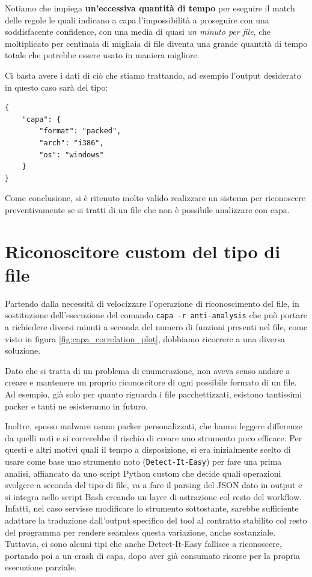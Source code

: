 \medskip

Notiamo che impiega \textbf{un'eccessiva quantità di tempo} per
eseguire il match delle regole le quali indicano a capa l'impossibilità a proseguire con una soddisfacente confidence, con una media di quasi \emph{un minuto per file}, che moltiplicato per centinaia di migliaia di file diventa una grande quantità di tempo totale che potrebbe essere usato in maniera migliore.

\medskip

Ci basta avere i dati di ciò che stiamo trattando, ad esempio l'output desiderato in questo caso sarà del tipo:
\begin{verbatim}
{
    "capa": {
        "format": "packed",
        "arch": "i386",
        "os": "windows"
    }
}
\end{verbatim}

Come conclusione, si è ritenuto molto valido realizzare un sistema per riconoscere preventivamente se si tratti di un file che non è possibile analizzare con capa.

\section{Riconoscitore custom del tipo di file}
\label{chap:static_custom_file_detector}
Partendo dalla necessità di velocizzare l'operazione di riconoscimento del file, in sostituzione dell'esecuzione del comando \texttt{capa -r anti-analysis} che può portare a richiedere diversi minuti a seconda del numero di funzioni presenti nel file, come visto in figura \ref{fig:capa_correlation_plot},
dobbiamo ricorrere a una diversa soluzione.

Dato che si tratta di un problema di enumerazione, non aveva senso andare a creare e mantenere un proprio riconoscitore di ogni possibile formato di un file. Ad esempio, già solo per quanto riguarda i file pacchettizzati, esistono tantissimi packer e tanti ne esisteranno in futuro.

Inoltre, spesso malware usano packer personalizzati, che hanno leggere differenze da quelli noti e si correrebbe il rischio di creare uno strumento poco efficace.
Per questi e altri motivi quali il tempo a disposizione, si era inizialmente scelto di usare come base uno strumento noto (\texttt{Detect-It-Easy}) per fare una prima analisi, affiancato da uno script Python custom che decide quali operazioni svolgere a seconda del tipo di file, va a fare il parsing del JSON dato in output e si integra nello script Bash creando un layer di astrazione col resto del workflow.
Infatti, nel caso servisse modificare lo strumento sottostante, sarebbe sufficiente adattare la traduzione dall'output specifico del tool al contratto stabilito col resto del programma per rendere seamless questa variazione, anche sostanziale.
Tuttavia, ci sono alcuni tipi che anche Detect-It-Easy fallisce a riconoscere, portando poi a un crash di capa, dopo aver già consumato risorse per la propria esecuzione parziale.

